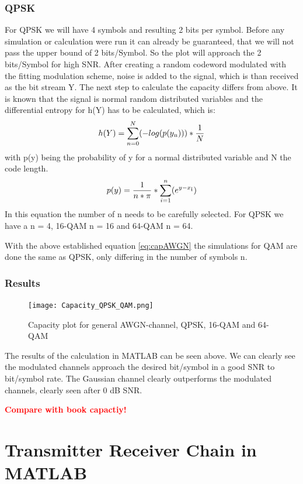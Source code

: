 \documentclass[12pt,oneside, draft]{report}
\newcommand\boldred[1]{\textcolor{red}{\textbf{#1}}}
\begin{document}
\subsection{QPSK}
For QPSK we will have 4 symbols and resulting 2 bits per symbol. Before any simulation or calculation were run it can already be guaranteed, that we will not pass the upper bound of 2 bits/Symbol. So the plot will approach the 2 bits/Symbol for high SNR.
After creating a random codeword modulated with the fitting modulation scheme, noise is added to the signal, which is than received as the bit stream Y. The next step to calculate the capacity differs from above. 
\newline
It is known that the signal is normal random distributed variables and the differential entropy for h(Y) has to be calculated, which is: 
\begin{equation}
\label{eq:entropy}
h(Y) =  \sum_{n=0}^N(-log(p(y\textsubscript{n}))) * \frac{1}{N}
\end{equation} 
with p(y) being the probability of y for a normal distributed variable and N the code length.
\begin{equation}
\label{eq:capAWGN}
p(y) = \frac{1}{n*\pi}*\sum_{i=1}^n(e^{y-x\textsubscript{i}})
\end{equation} 
In this equation the number of n needs to be carefully selected. For QPSK we have a n = 4, 16-QAM n = 16 and 64-QAM n = 64.
 
With the above established equation \ref{eq:capAWGN} the simulations for \gls{QAM} are done the same as QPSK, only differing in the number of symbols n. 
\subsection{Results}
\begin{figure}[H]
	\centering
	\texttt{[image: Capacity\_QPSK\_QAM.png]}
	\caption{Capacity plot for general AWGN-channel, QPSK, 16-QAM and 64-QAM}
	\label{fig:capmod}
\end{figure}
The results of the calculation in MATLAB can be seen above. We can clearly see the modulated channels approach the desired bit/symbol in a good SNR to bit/symbol rate. The Gaussian channel clearly outperforms the modulated channels, clearly seen after 0 dB SNR.

\boldred{Compare with book capactiy!}


\chapter{Transmitter Receiver Chain in MATLAB}
\end{document}
